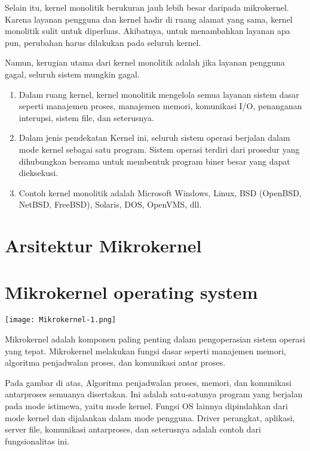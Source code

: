 \documentclass{article}
\begin{document}
	Selain itu, kernel monolitik berukuran jauh lebih besar daripada mikrokernel. Karena layanan pengguna dan kernel hadir di ruang alamat yang sama, kernel monolitik sulit untuk diperluas. Akibatnya, untuk menambahkan layanan apa pun, perubahan harus dilakukan pada seluruh kernel.
	
	Namun, kerugian utama dari kernel monolitik adalah jika layanan pengguna gagal, seluruh sistem mungkin gagal.
	
	\begin{enumerate}
		\item Dalam ruang kernel, kernel monolitik mengelola semua layanan sistem dasar seperti manajemen proses, manajemen memori, komunikasi I/O, penanganan interupsi, sistem file, dan seterusnya.
		
		\item Dalam jenis pendekatan Kernel ini, seluruh sistem operasi berjalan dalam mode kernel sebagai satu program. Sistem operasi terdiri dari prosedur yang dihubungkan bersama untuk membentuk program biner besar yang dapat dieksekusi.
		
		\item Contoh kernel monolitik adalah Microsoft Windows, Linux, BSD (OpenBSD, NetBSD, FreeBSD), Solaris, DOS, OpenVMS, dll.
	\end{enumerate}

	\vskip0.5cm

	\section*{Arsitektur Mikrokernel}

	\section{Mikrokernel operating system}
		\texttt{[image: Mikrokernel-1.png]}

	
	Mikrokernel adalah komponen paling penting dalam pengoperasian sistem operasi yang tepat. Mikrokernel melakukan fungsi dasar seperti manajemen memori, algoritma penjadwalan proses, dan komunikasi antar proses.
	
	Pada gambar di atas, Algoritma penjadwalan proses, memori, dan komunikasi antarproses semuanya disertakan. Ini adalah satu-satunya program yang berjalan pada mode istimewa, yaitu mode kernel. Fungsi OS lainnya dipindahkan dari mode kernel dan dijalankan dalam mode pengguna. Driver perangkat, aplikasi, server file, komunikasi antarproses, dan seterusnya adalah contoh dari fungsionalitas ini.
	
\end{document}
